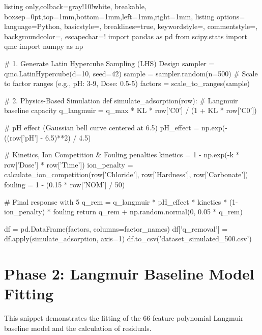 \begin{tcblisting}{listing only,colback=gray!10!white, breakable, boxsep=0pt,top=1mm,bottom=1mm,left=1mm,right=1mm,
listing options={
language=Python,
basicstyle=\small\ttfamily, 
breaklines=true,
keywordstyle=\color{blue}, 
commentstyle=\color{gray},
backgroundcolor=\color{gray!10},
escapechar=!}}
import pandas as pd
from scipy.stats import qmc
import numpy as np

# 1. Generate Latin Hypercube Sampling (LHS) Design
sampler = qmc.LatinHypercube(d=10, seed=42)
sample = sampler.random(n=500)
# Scale to factor ranges (e.g., pH: 3-9, Dose: 0.5-5)
factors = scale_to_ranges(sample) 

# 2. Physics-Based Simulation
def simulate_adsorption(row):
    # Langmuir baseline capacity
    q_langmuir = q_max * KL * row['C0'] / (1 + KL * row['C0'])
    
    # pH effect (Gaussian bell curve centered at 6.5)
    pH_effect = np.exp(-((row['pH'] - 6.5)**2) / 4.5)
    
    # Kinetics, Ion Competition & Fouling penalties
    kinetics = 1 - np.exp(-k * row['Dose'] * row['Time'])
    ion_penalty = calculate_ion_competition(row['Chloride'], 
                                            row['Hardness'], 
                                            row['Carbonate'])
    fouling = 1 - (0.15 * row['NOM'] / 50)
    
    # Final response with 5%
    q_rem = q_langmuir * pH_effect * kinetics * (1-ion_penalty) * fouling
    return q_rem + np.random.normal(0, 0.05 * q_rem)

df = pd.DataFrame(factors, columns=factor_names)
df['q_removal'] = df.apply(simulate_adsorption, axis=1)
df.to_csv('dataset_simulated_500.csv')
\end{tcblisting}

\section{Phase 2: Langmuir Baseline Model Fitting}
This snippet demonstrates the fitting of the 66-feature polynomial Langmuir baseline model and the calculation of residuals.


